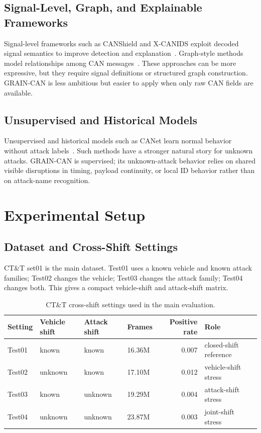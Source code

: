 \documentclass[runningheads]{llncs}
\newcommand{\method}{GRAIN-CAN}
\begin{document}
\subsection{Signal-Level, Graph, and Explainable Frameworks}
Signal-level frameworks such as CANShield and X-CANIDS exploit decoded signal semantics to improve detection and explanation~\cite{shahriar2022,xcanids2023}. Graph-style methods model relationships among CAN messages~\cite{wang2023}. These approaches can be more expressive, but they require signal definitions or structured graph construction. \method{} is less ambitious but easier to apply when only raw CAN fields are available.

\subsection{Unsupervised and Historical Models}
Unsupervised and historical models such as CANet learn normal behavior without attack labels~\cite{canet2019}. Such methods have a stronger natural story for unknown attacks. \method{} is supervised; its unknown-attack behavior relies on shared visible disruptions in timing, payload continuity, or local ID behavior rather than on attack-name recognition.

\section{Experimental Setup}
\subsection{Dataset and Cross-Shift Settings}
CT\&T set01 is the main dataset. Test01 uses a known vehicle and known attack families; Test02 changes the vehicle; Test03 changes the attack family; Test04 changes both. This gives a compact vehicle-shift and attack-shift matrix.

\begin{table}[t]
\caption{CT\&T cross-shift settings used in the main evaluation.}
\label{tab:settings}
\centering\small
\begin{tabular}{llllrl}
\toprule
Setting & Vehicle shift & Attack shift & Frames & Positive rate & Role \\
\midrule
Test01 & known & known & 16.36M & 0.007 & closed-shift reference \\
Test02 & unknown & known & 17.10M & 0.012 & vehicle-shift stress \\
Test03 & known & unknown & 19.29M & 0.004 & attack-shift stress \\
Test04 & unknown & unknown & 23.87M & 0.003 & joint-shift stress \\
\bottomrule
\end{tabular}
\end{table}
\end{document}
